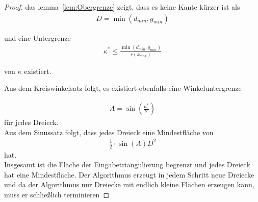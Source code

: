 \begin{proof}
das lemma~\ref{lem:Obergrenze} zeigt, dass es keine Kante kürzer ist als  \begin{align*}
    D = \min(d_{min},g_{min})
\end{align*}

und eine Untergrenze \begin{align*}
    \kappa^* \leq \frac{\min(d_{min},g_{min})}{r(k_{max})}
\end{align*}

von $\kappa$ existiert.

Aus dem Kreiswinkelsatz folgt, es existiert ebenfalls eine Winkeluntergrenze 

\begin{align*}
    A = \sin(\frac{\kappa^*}{2})
\end{align*}
für jedes Dreieck.\\
Aus dem Sinussatz folgt, dass jedes Dreieck eine Mindestfläche von \begin{align*}
    \frac{1}{2} \cdot \sin(A)D^2 
\end{align*}
hat.\\

Insgesamt ist die Fläche der Eingabetriangulierung begrenzt und jedes Dreieck hat eine Mindestfläche. Der Algorithmus erzeugt in jedem Schritt neue Dreiecke und da der Algorithmus nur Dreiecke mit endlich kleine Flächen erzeugen kann, muss er schließlich terminieren
\end{proof}








